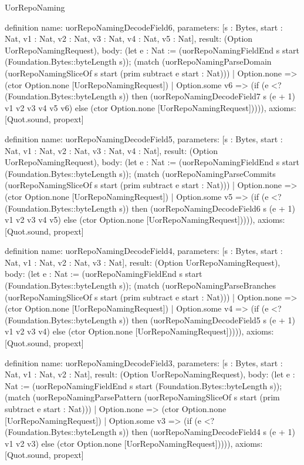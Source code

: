 \begin{lexlean}{UorRepoNaming}
\begin{semanticmodule}
definition{
  name: uorRepoNamingDecodeField6,
  parameters: [s : Bytes, start : Nat, v1 : Nat, v2 : Nat, v3 : Nat, v4 : Nat, v5 : Nat],
  result: (Option UorRepoNamingRequest),
  body: (let e : Nat := (uorRepoNamingFieldEnd s start (Foundation.Bytes::byteLength s)); (match (uorRepoNamingParseDomain (uorRepoNamingSliceOf s start (prim subtract e start : Nat)))
    | Option.none => (ctor Option.none [UorRepoNamingRequest])
    | Option.some v6 => (if (e <? (Foundation.Bytes::byteLength s)) then (uorRepoNamingDecodeField7 s (e + 1) v1 v2 v3 v4 v5 v6) else (ctor Option.none [UorRepoNamingRequest])))),
  axioms: [Quot.sound, propext]
}

definition{
  name: uorRepoNamingDecodeField5,
  parameters: [s : Bytes, start : Nat, v1 : Nat, v2 : Nat, v3 : Nat, v4 : Nat],
  result: (Option UorRepoNamingRequest),
  body: (let e : Nat := (uorRepoNamingFieldEnd s start (Foundation.Bytes::byteLength s)); (match (uorRepoNamingParseCommits (uorRepoNamingSliceOf s start (prim subtract e start : Nat)))
    | Option.none => (ctor Option.none [UorRepoNamingRequest])
    | Option.some v5 => (if (e <? (Foundation.Bytes::byteLength s)) then (uorRepoNamingDecodeField6 s (e + 1) v1 v2 v3 v4 v5) else (ctor Option.none [UorRepoNamingRequest])))),
  axioms: [Quot.sound, propext]
}

definition{
  name: uorRepoNamingDecodeField4,
  parameters: [s : Bytes, start : Nat, v1 : Nat, v2 : Nat, v3 : Nat],
  result: (Option UorRepoNamingRequest),
  body: (let e : Nat := (uorRepoNamingFieldEnd s start (Foundation.Bytes::byteLength s)); (match (uorRepoNamingParseBranches (uorRepoNamingSliceOf s start (prim subtract e start : Nat)))
    | Option.none => (ctor Option.none [UorRepoNamingRequest])
    | Option.some v4 => (if (e <? (Foundation.Bytes::byteLength s)) then (uorRepoNamingDecodeField5 s (e + 1) v1 v2 v3 v4) else (ctor Option.none [UorRepoNamingRequest])))),
  axioms: [Quot.sound, propext]
}

definition{
  name: uorRepoNamingDecodeField3,
  parameters: [s : Bytes, start : Nat, v1 : Nat, v2 : Nat],
  result: (Option UorRepoNamingRequest),
  body: (let e : Nat := (uorRepoNamingFieldEnd s start (Foundation.Bytes::byteLength s)); (match (uorRepoNamingParsePattern (uorRepoNamingSliceOf s start (prim subtract e start : Nat)))
    | Option.none => (ctor Option.none [UorRepoNamingRequest])
    | Option.some v3 => (if (e <? (Foundation.Bytes::byteLength s)) then (uorRepoNamingDecodeField4 s (e + 1) v1 v2 v3) else (ctor Option.none [UorRepoNamingRequest])))),
  axioms: [Quot.sound, propext]
}


\end{semanticmodule}
\end{lexlean}
